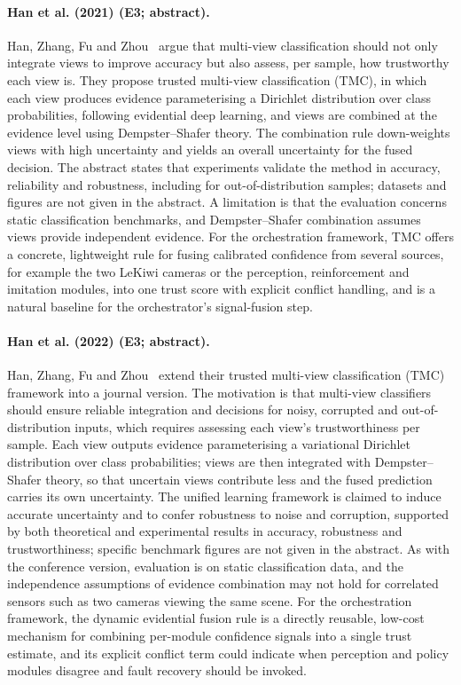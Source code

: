 \documentclass[10pt,a4paper]{article}
\begin{document}
\paragraph{Han et al. (2021) (E3; abstract).} Han, Zhang, Fu and Zhou~\cite{Han2021} argue that multi-view classification should not only integrate views to improve accuracy but also assess, per sample, how trustworthy each view is. They propose trusted multi-view classification (TMC), in which each view produces evidence parameterising a Dirichlet distribution over class probabilities, following evidential deep learning, and views are combined at the evidence level using Dempster--Shafer theory. The combination rule down-weights views with high uncertainty and yields an overall uncertainty for the fused decision. The abstract states that experiments validate the method in accuracy, reliability and robustness, including for out-of-distribution samples; datasets and figures are not given in the abstract. A limitation is that the evaluation concerns static classification benchmarks, and Dempster--Shafer combination assumes views provide independent evidence. For the orchestration framework, TMC offers a concrete, lightweight rule for fusing calibrated confidence from several sources, for example the two LeKiwi cameras or the perception, reinforcement and imitation modules, into one trust score with explicit conflict handling, and is a natural baseline for the orchestrator's signal-fusion step.

\paragraph{Han et al. (2022) (E3; abstract).} Han, Zhang, Fu and Zhou~\cite{Han2022a} extend their trusted multi-view classification (TMC) framework into a journal version. The motivation is that multi-view classifiers should ensure reliable integration and decisions for noisy, corrupted and out-of-distribution inputs, which requires assessing each view's trustworthiness per sample. Each view outputs evidence parameterising a variational Dirichlet distribution over class probabilities; views are then integrated with Dempster--Shafer theory, so that uncertain views contribute less and the fused prediction carries its own uncertainty. The unified learning framework is claimed to induce accurate uncertainty and to confer robustness to noise and corruption, supported by both theoretical and experimental results in accuracy, robustness and trustworthiness; specific benchmark figures are not given in the abstract. As with the conference version, evaluation is on static classification data, and the independence assumptions of evidence combination may not hold for correlated sensors such as two cameras viewing the same scene. For the orchestration framework, the dynamic evidential fusion rule is a directly reusable, low-cost mechanism for combining per-module confidence signals into a single trust estimate, and its explicit conflict term could indicate when perception and policy modules disagree and fault recovery should be invoked.
\end{document}
